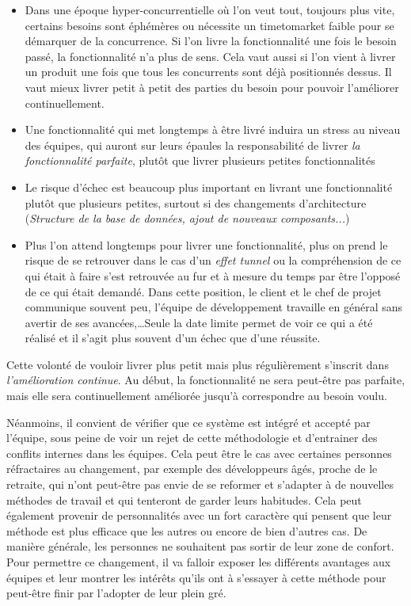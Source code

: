 \begin{itemize}
	\setlength\itemsep{0em}
	\item Dans une époque hyper-concurrentielle où l'on veut tout, toujours plus vite, certains besoins sont éphémères ou nécessite un \gls{timetomarket} faible pour se démarquer de la concurrence. Si l'on livre la fonctionnalité une fois le besoin passé, la fonctionnalité n'a plus de sens. Cela vaut aussi si l'on vient à livrer un produit une fois que tous les concurrents sont déjà positionnés dessus. Il vaut mieux livrer petit à petit des parties du besoin pour pouvoir l'améliorer continuellement.
	\item Une fonctionnalité qui met longtemps à être livré induira un stress au niveau des équipes, qui auront sur leurs épaules la responsabilité de livrer \emph{la fonctionnalité parfaite}, plutôt que livrer plusieurs petites fonctionnalités
	\item Le risque d'échec est beaucoup plus important en livrant une fonctionnalité plutôt que plusieurs petites, surtout si des changements d'architecture (\emph{Structure de la base de données, ajout de nouveaux composants...})
	\item Plus l'on attend longtemps pour livrer une fonctionnalité, plus on prend le risque de se retrouver dans le cas d'un \emph{effet tunnel} ou la compréhension de ce qui était à faire s'est retrouvée au fur et à mesure du temps par être l'opposé de ce qui était demandé. Dans cette position, le client et le chef de projet communique souvent peu, l'équipe de développement travaille en général sans avertir de ses avancées,\ldots Seule la date limite permet de voir ce qui a été réalisé et il s'agit plus souvent d'un échec que d'une réussite.
\end{itemize}

Cette volonté de vouloir livrer plus petit mais plus régulièrement s'inscrit dans \emph{l'amélioration continue}. Au début, la fonctionnalité ne sera peut-être pas parfaite, mais elle sera continuellement améliorée jusqu'à correspondre au besoin voulu. 


Néanmoins, il convient de vérifier que ce système est intégré et accepté par l'équipe, sous peine de voir un rejet de cette méthodologie et d'entrainer des conflits internes dans les équipes. Cela peut être le cas avec certaines personnes réfractaires au changement, par exemple des développeurs âgés, proche de le retraite, qui n'ont peut-être pas envie de se reformer et s'adapter à de nouvelles méthodes de travail et qui tenteront de garder leurs habitudes. Cela peut également provenir de personnalités avec un fort caractère qui pensent que leur méthode est plus efficace que les autres ou encore de bien d'autres cas. De manière générale, les personnes ne souhaitent pas sortir de leur zone de confort. Pour permettre ce changement, il va falloir exposer les différents avantages aux équipes et leur montrer les intérêts qu'ils ont à s'essayer à cette méthode pour peut-être finir par l'adopter de leur plein gré. 

